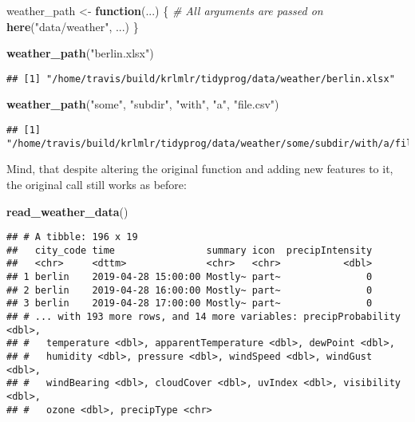 \documentclass[]{book}
\newenvironment{Shaded}{\begin{snugshade}}{\end{snugshade}}
\newcommand{\CommentTok}[1]{\textcolor[rgb]{0.56,0.35,0.01}{\textit{#1}}}
\newcommand{\ControlFlowTok}[1]{\textcolor[rgb]{0.13,0.29,0.53}{\textbf{#1}}}
\newcommand{\KeywordTok}[1]{\textcolor[rgb]{0.13,0.29,0.53}{\textbf{#1}}}
\newcommand{\NormalTok}[1]{#1}
\newcommand{\StringTok}[1]{\textcolor[rgb]{0.31,0.60,0.02}{#1}}
\begin{document}
\begin{Shaded}
\begin{Highlighting}[]
\NormalTok{weather_path <-}\StringTok{ }\ControlFlowTok{function}\NormalTok{(...) \{}
  \CommentTok{# All arguments are passed on}
  \KeywordTok{here}\NormalTok{(}\StringTok{"data/weather"}\NormalTok{, ...)}
\NormalTok{\}}

\KeywordTok{weather_path}\NormalTok{(}\StringTok{"berlin.xlsx"}\NormalTok{)}
\end{Highlighting}
\end{Shaded}

\begin{verbatim}
## [1] "/home/travis/build/krlmlr/tidyprog/data/weather/berlin.xlsx"
\end{verbatim}

\begin{Shaded}
\begin{Highlighting}[]
\KeywordTok{weather_path}\NormalTok{(}\StringTok{"some"}\NormalTok{, }\StringTok{"subdir"}\NormalTok{, }\StringTok{"with"}\NormalTok{, }\StringTok{"a"}\NormalTok{, }\StringTok{"file.csv"}\NormalTok{)}
\end{Highlighting}
\end{Shaded}

\begin{verbatim}
## [1] "/home/travis/build/krlmlr/tidyprog/data/weather/some/subdir/with/a/file.csv"
\end{verbatim}

Mind, that despite altering the original function and adding new features to it, the original call still works as before:

\begin{Shaded}
\begin{Highlighting}[]
\KeywordTok{read_weather_data}\NormalTok{()}
\end{Highlighting}
\end{Shaded}

\begin{verbatim}
## # A tibble: 196 x 19
##   city_code time                summary icon  precipIntensity
##   <chr>     <dttm>              <chr>   <chr>           <dbl>
## 1 berlin    2019-04-28 15:00:00 Mostly~ part~               0
## 2 berlin    2019-04-28 16:00:00 Mostly~ part~               0
## 3 berlin    2019-04-28 17:00:00 Mostly~ part~               0
## # ... with 193 more rows, and 14 more variables: precipProbability <dbl>,
## #   temperature <dbl>, apparentTemperature <dbl>, dewPoint <dbl>,
## #   humidity <dbl>, pressure <dbl>, windSpeed <dbl>, windGust <dbl>,
## #   windBearing <dbl>, cloudCover <dbl>, uvIndex <dbl>, visibility <dbl>,
## #   ozone <dbl>, precipType <chr>
\end{verbatim}
\end{document}
